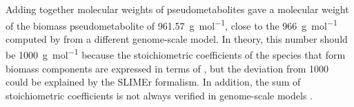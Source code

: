 Adding together molecular weights of pseudometabolites gave a molecular weight of the biomass pseudometabolite of \SI{961.57}{\gram~\mol^{-1}}, close to the \SI{966}{\gram~\mol^{-1}} computed by \textcite{takhaveevTemporalSegregationBiosynthetic2023} from a different genome-scale model.
In theory, this number should be \SI{1000}{\gram~\mol^{-1}} because the stoichiometric coefficients of the species that form biomass components are expressed in terms of \SI{}{\mmolgdw} \parencite{thieleProtocolGeneratingHighquality2010, palssonSystemsBiologyConstraintbased2015}, but the deviation from 1000 could be explained by the SLIMEr formalism.
In addition, the sum of stoichiometric coefficients is not always verified in genome-scale models \parencite{chanStandardizingBiomassReactions2017}.

